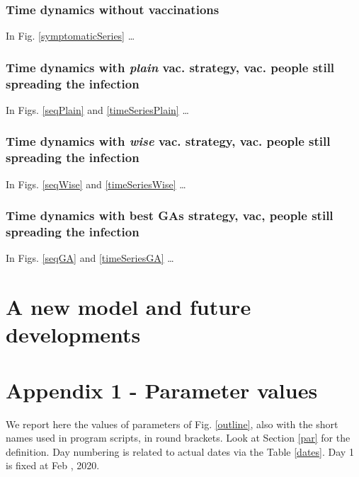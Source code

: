 \documentclass[graybox]{svmult}
\begin{document}
\subsubsection{Time dynamics without vaccinations}
\label{dybWithout}

In Fig. \ref{symptomaticSeries} \ldots

\subsubsection{Time dynamics with \emph{plain} vac. strategy, vac. people still spreading the infection}
\label{dynPlain}

In Figs. \ref{seqPlain} and \ref{timeSeriesPlain} \ldots

\subsubsection{Time dynamics with \emph{wise} vac. strategy, vac. people still spreading the infection}
\label{dynWise}

In Figs. \ref{seqWise} and \ref{timeSeriesWise} \ldots

\subsubsection{Time dynamics with best GAs strategy, vac, people still spreading the infection}
\label{dynGA}

In Figs. \ref{seqGA} and \ref{timeSeriesGA} \ldots

\section{A new model and future developments}
\label{newModel}

\section{Appendix 1 - Parameter values}
\label{app1}

We report here the values of parameters of Fig. \ref{outline}, also with the short names used in program scripts, in round brackets. Look at Section \ref{par} for the definition. Day numbering is related to actual dates via the Table \ref{dates}. Day 1 is fixed at Feb , 2020.
\end{document}
